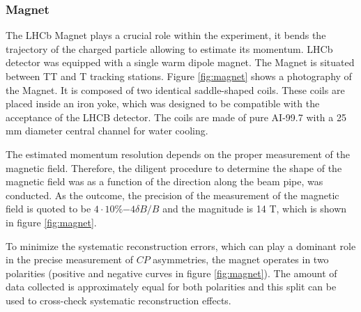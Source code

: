\subsubsection{Magnet}

The LHCb Magnet plays a crucial role within the experiment, it bends the trajectory of the charged particle allowing to estimate its momentum. LHCb detector was equipped with a single warm dipole magnet. The Magnet is situated between TT and T tracking stations. 
Figure \ref{fig:magnet} shows a photography of the Magnet. It is composed of two identical saddle-shaped coils. These coils are placed inside an iron yoke, which was designed to be compatible with the acceptance of the LHCB detector. The coils are made of pure AI-99.7 with a 25 mm diameter central channel for water cooling. 

The estimated momentum resolution depends on the proper measurement of the magnetic field. Therefore, the diligent procedure to determine the shape of the magnetic field was as a function of the direction along the beam pipe, was conducted. As the outcome, the precision of the measurement of the magnetic field is quoted to be $4 \cdot 10 \%{-4} \delta B /B $ and the magnitude is 14 T, which is shown in figure \ref{fig:magnet}. 

To minimize the systematic reconstruction errors, which can play a dominant role in the precise measurement of $CP$ asymmetries,  the magnet operates in two polarities (positive and negative curves in figure \ref{fig:magnet}). The amount of data collected is approximately equal for both polarities and this split can be used to cross-check systematic reconstruction effects.   



